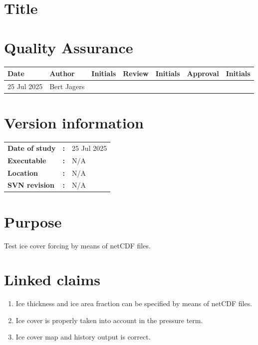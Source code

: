 \section{Title}
\newrefsegment

\section*{Quality Assurance}
{{\footnotesize
\begin{tabular}{p{22mm-2pt}@{}p{27mm-2pt}@{}p{18mm}@{}p{27mm-2pt}@{}p{18mm}@{}p{27mm-2pt}@{}p{\textwidth-139mm-1pt}} \hline
    \rowcolor{dgrey4}
\textbf{Date} & \textbf{Author} & \textbf{Initials} & \textbf{Review} & \textbf{Initials} & \textbf{Approval} & \textbf{Initials}  \\ \hline
25 Jul 2025 & Bert Jagers & & & & &   \\ \hline
  \end{tabular}
}}

\section*{Version information}
\begin{tabular}{@{}p{23mm}@{}p{0mm}p{\textwidth-23mm-30pt}}
\textbf{Date of study}& \textbf{:} & 25 Jul 2025 \\
\textbf{Executable}   & \textbf{:} & N/A \\
\textbf{Location}     & \textbf{:} & N/A \\ 
\textbf{SVN revision} & \textbf{:} & N/A
\end{tabular}

\section*{Purpose}

Test ice cover forcing by means of netCDF files.

\section*{Linked claims}
\phantom{text}\vspace*{-\baselineskip}
\begin{enumerate}
	\item Ice thickness and ice area fraction can be specified by means of netCDF files.
	\item Ice cover is properly taken into account in the pressure term.
	\item Ice cover map and history output is correct.
\end{enumerate}

